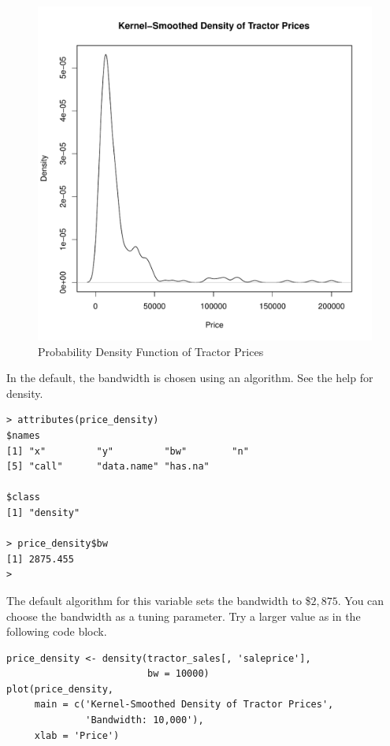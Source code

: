 \documentclass[11pt]{book}
\begin{document}
\begin{figure}[h!]
  \centering
  \includegraphics[scale = 0.5, keepaspectratio=true]{../Figures/density_saleprice}
  \caption{Probability Density Function of Tractor Prices} \label{fig:density_saleprice}
\end{figure}

\pagebreak
In the default, the bandwidth is chosen using an algorithm.
See the help for density.

\begin{verbatim}
> attributes(price_density)
$names
[1] "x"         "y"         "bw"        "n"
[5] "call"      "data.name" "has.na"

$class
[1] "density"

> price_density$bw
[1] 2875.455
>
\end{verbatim}

The default algorithm for this variable sets the bandwidth to \$$2,875$.
You can choose the bandwidth as a tuning parameter.
Try a larger value as in the following code block.

\begin{verbatim}
price_density <- density(tractor_sales[, 'saleprice'],
                         bw = 10000)
plot(price_density,
     main = c('Kernel-Smoothed Density of Tractor Prices',
              'Bandwidth: 10,000'),
     xlab = 'Price')
\end{verbatim}
\end{document}
